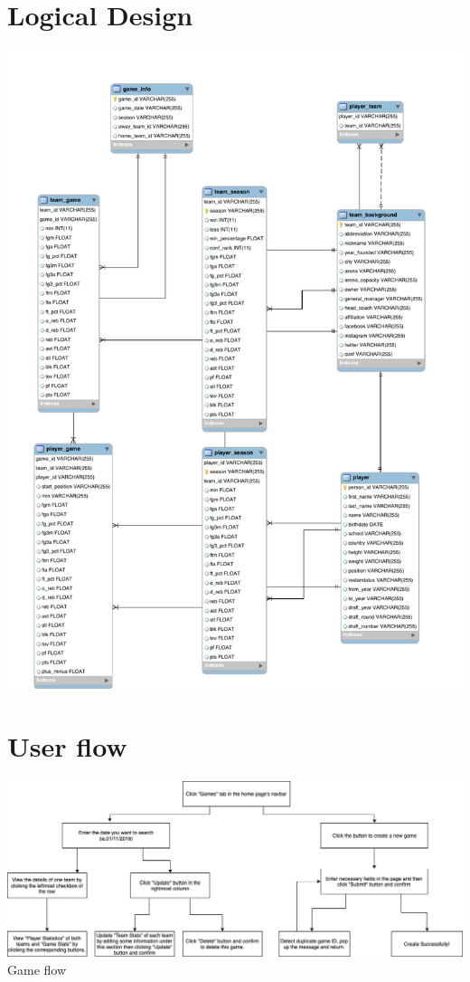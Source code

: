 \documentclass[a4paper,12pt]{article} %
\begin{document}
\section{Logical Design}
\begin{center}
\includegraphics[width=1\textwidth]{schema}
\end{center}

\section{User flow}
\begin{center}
\includegraphics[width=1\textwidth]{User_Flow_Game}
Game flow
\end{center}
\end{document}
